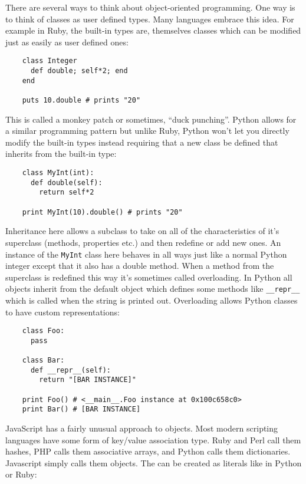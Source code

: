 \documentclass[11pt]{article}
\begin{document}
   There are several ways to think about object-oriented programming.
   One way is to think of classes as user defined types.  Many
   languages embrace this idea.  For example in Ruby, the built-in
   types are, themselves classes which can be modified just as easily
   as user defined ones:
   
\begin{verbatim}
    class Integer
      def double; self*2; end
    end
    
    puts 10.double # prints "20"
\end{verbatim}

   
   This is called a monkey patch or sometimes, ``duck punching''. Python
   allows for a similar programming pattern but unlike Ruby, Python
   won't let you directly modify the built-in types instead requiring
   that a new class be defined that inherits from the built-in type:
   
\begin{verbatim}
    class MyInt(int):
      def double(self):
        return self*2
    
    print MyInt(10).double() # prints "20"
\end{verbatim}

   
   Inheritance here allows a subclass to take on all of the
   characteristics of it's superclass (methods, properties etc.) and
   then redefine or add new ones.  An instance of the \verb|MyInt|
   class here behaves in all ways just like a normal Python integer
   except that it also has a double method.  When a method from the
   superclass is redefined this way it's sometimes called
   overloading.  In Python all objects inherit from the default object
   which defines some methods like \verb|__repr__| which is called when the
   string is printed out.  Overloading allows Python classes to have
   custom representations:
   
\begin{verbatim}
    class Foo:
      pass
    
    class Bar:
      def __repr__(self):
        return "[BAR INSTANCE]"
    
    print Foo() # <__main__.Foo instance at 0x100c658c0>
    print Bar() # [BAR INSTANCE]
\end{verbatim}

   
   JavaScript has a fairly unusual approach to objects.  Most modern
   scripting languages have some form of key/value association type.
   Ruby and Perl call them hashes, PHP calls them associative arrays,
   and Python calls them dictionaries.  Javascript simply calls them
   objects.  The can be created as literals like in Python or Ruby:
   
\end{document}
